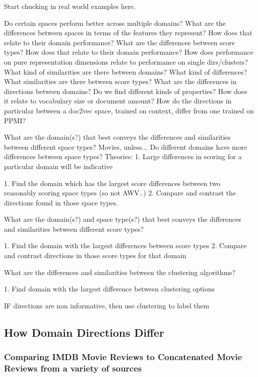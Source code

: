 Start chucking in real world examples here.

Do certain spaces perform better across multiple domains?
What are the differences between spaces in terms of the features they represent? How does that relate to their domain performance?
What are the differences between score types? How does that relate to their domain performance?
How does performance on pure representation dimensions relate to performance on single dirs/clusters?
What kind of similarities are there between domains? What kind of differences?
What similarities are there between score types?
What are the differences in directions between domains? Do we find different kinds of properties? How does it relate to vocabulary size or document amount?
How do the directions in particular between a doc2vec space, trained on context, differ from one trained on PPMI?


What are the domain(s?) that best conveys the differences and similarities between different space types?
	Movies, unless...
		Do different domains have more differences between space types? Theories:
			1. Large differences in scoring for a particular domain will be indicative
			
1. Find the domain which has the largest score differences between two reasonably scoring space types (so not AWV..)
2. Compare and contrast the directions found in those space types. 

What are the domain(s?) and space type(s?) that best conveys the differences and similarities between different score types?

1. Find the domain with the largest differences between score types
2. Compare and contrast directions in those score types for that domain



What are the differences and similarities between the clustering algorithms?

1. Find domain with the largest difference between clustering options

IF directions are non informative, then use clustering to label them

\subsection{How Domain Directions Differ}

\subsubsection{Comparing IMDB Movie Reviews to Concatenated Movie Reviews from a variety of sources}


